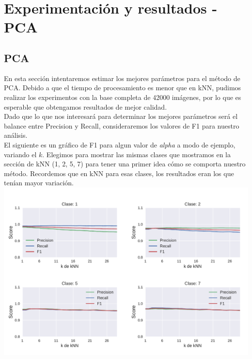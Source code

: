 
\section{Experimentación y resultados - PCA}

\subsection{PCA}

En esta sección intentaremos estimar los mejores parámetros para el método de PCA. Debido a que el tiempo de procesamiento es menor que en kNN, pudimos realizar los experimentos con la base completa de 42000 imágenes, por lo que es esperable que obtengamos resultados de mejor calidad. \\

Dado que lo que nos interesará para determinar los mejores parámetros será el balance entre Precision y Recall, consideraremos los valores de F1 para nuestro análisis.  \\

El siguiente es un gráfico de F1 para algun valor de \textit{alpha} a modo de ejemplo, variando el $k$. Elegimos para mostrar las mismas clases que mostramos en la sección de kNN (1, 2, 5, 7) para tener una primer idea cómo se comporta nuestro método. Recordemos que en kNN para esas clases, los resultados eran los que tenían mayor variación. \\

{\centering
    \includegraphics[scale=0.65]{informe/imagenes/pca/variacionKClases1257PresRecall.pdf} \\
}
$ $\newline

